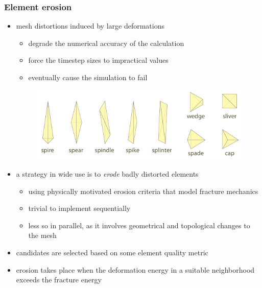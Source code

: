 \begin{frame}[fragile]
%
  \frametitle{Element erosion}
%
  \begin{itemize}
%
  \item mesh distortions induced by large deformations
    \begin{itemize}
    \item degrade the numerical accuracy of the calculation
    \item force the timestep sizes to impractical values
    \item eventually cause the simulation to fail
    \end{itemize}
%
  \begin{figure}
    \includegraphics[scale=0.8]{figures/mesh-pathologies.pdf}
  \end{figure}
%
  \item a strategy in wide use is to {\em erode} badly distorted elements
    \begin{itemize}
    \item using physically motivated erosion criteria that model fracture mechanics
    \item trivial to implement sequentially
    \item less so in parallel, as it involves geometrical and topological changes to the mesh
    \end{itemize}
%
  \item candidates are selected based on some element quality metric
  \item erosion takes place when the deformation energy in a suitable neighborhood exceeds the
    fracture energy
%
  \end{itemize}
%
\end{frame}

